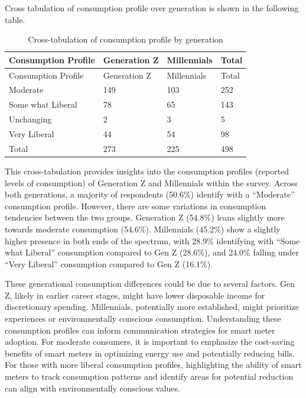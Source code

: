 \documentclass[
  letterpaper,
  DIV=11,
  numbers=noendperiod]{scrartcl}
\begin{document}
Cross tabulation of consumption profile over generation is shown in the
following table.

\begin{longtable}[]{@{}llll@{}}
\caption{Cross-tabulation of consumption profile by
generation}\label{tbl-consumption-profile-generation}\tabularnewline
\toprule\noalign{}
Consumption Profile & Generation Z & Millennials & Total \\
\midrule\noalign{}
\endfirsthead
\toprule\noalign{}
Consumption Profile & Generation Z & Millennials & Total \\
\midrule\noalign{}
\endhead
\bottomrule\noalign{}
\endlastfoot
Moderate & 149 & 103 & 252 \\
Some what Liberal & 78 & 65 & 143 \\
Unchanging & 2 & 3 & 5 \\
Very Liberal & 44 & 54 & 98 \\
Total & 273 & 225 & 498 \\
\end{longtable}

This cross-tabulation provides insights into the consumption profiles
(reported levels of consumption) of Generation Z and Millennials within
the survey. Across both generations, a majority of respondents (50.6\%)
identify with a ``Moderate'' consumption profile. However, there are
some variations in consumption tendencies between the two groups.
Generation Z (54.8\%) leans slightly more towards moderate consumption
(54.6\%). Millennials (45.2\%) show a slightly higher presence in both
ends of the spectrum, with 28.9\% identifying with ``Some what Liberal''
consumption compared to Gen Z (28.6\%), and 24.0\% falling under ``Very
Liberal'' consumption compared to Gen Z (16.1\%).

These generational consumption differences could be due to several
factors. Gen Z, likely in earlier career stages, might have lower
disposable income for discretionary spending. Millennials, potentially
more established, might prioritize experiences or environmentally
conscious consumption. Understanding these consumption profiles can
inform communication strategies for smart meter adoption. For moderate
consumers, it is important to emphasize the cost-saving benefits of
smart meters in optimizing energy use and potentially reducing bills.
For those with more liberal consumption profiles, highlighting the
ability of smart meters to track consumption patterns and identify areas
for potential reduction can align with environmentally conscious values.
\end{document}
